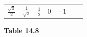 {{\begin{center}
\begin{tabular}[t]{|l|l|l|l|l|l|l|}
                  \begin{math}\frac{\sqrt{3}}{2}\end{math}
                 &
    
    
        
                  \begin{math}\frac{1}{\sqrt{2}}\end{math}
                 &
    
    
        
                  \begin{math}\frac{1}{2}\end{math}
                 &
    
    
        0 &
    
    
        
                  \begin{math}-1\end{math}
     \tabularnewline\cline{1-1}\cline{2-2}\cline{3-3}\cline{4-4}\cline{5-5}\cline{6-6}\cline{7-7}
    \end{tabular}
      \end{center}
    \begin{center}{\small\bfseries Table 14.8}\end{center}
    
    \addtocounter{footnote}{-0}
    
          }{ %
        
}}
